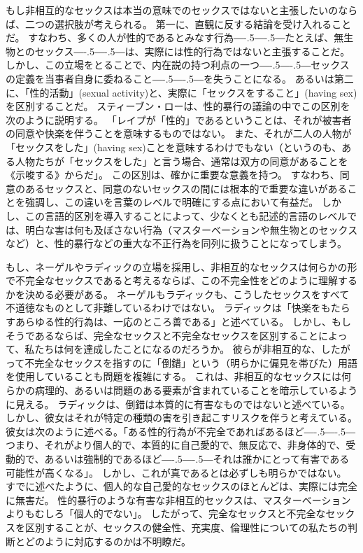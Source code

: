 \documentclass[paper=a4,book,openany]{jlreq}
\def\DDASH{―\kern-.5\zw―\kern-.5\zw―} %
\begin{document}
もし非相互的なセックスは本当の意味でのセックスではないと主張したいのならば、二つの選択肢が考えられる。
第一に、直観に反する結論を受け入れることだ。
すなわち、多くの人が性的であるとみなす行為{\DDASH}たとえば、無生物とのセックス{\DDASH}は、実際には性的行為ではないと主張することだ。
しかし、この立場をとることで、内在説の持つ利点の一つ{\DDASH}セックスの定義を当事者自身に委ねること{\DDASH}を失うことになる。
あるいは第二に、「性的活動」(sexual activity)と、実際に「セックスをすること」(having sex)を区別することだ。
スティーブン・ローは、性的暴行の議論の中でこの区別を次のように説明する。
「レイプが「性的」であるということは、それが被害者の同意や快楽を伴うことを意味するものではない。
また、それが二人の人物が「セックスをした」(having sex)ことを意味するわけでもない（というのも、ある人物たちが「セックスをした」と言う場合、通常は双方の同意があることを《示唆する》からだ」\citep[p.69]{law09:_rape_is_sex_act}。
この区別は、確かに重要な意義を持つ。
すなわち、同意のあるセックスと、同意のないセックスの間には根本的で重要な違いがあることを強調し、この違いを言葉のレベルで明確にする点において有益だ。
しかし、この言語的区別を導入することによって、少なくとも記述的言語のレベルでは、明白な害は何も及ぼさない行為（マスターベーションや無生物とのセックスなど）と、性的暴行などの重大な不正行為を同列に扱うことになってしまう。

もし、ネーゲルやラディックの立場を採用し、非相互的なセックスは何らかの形で不完全なセックスであると考えるならば、この不完全性をどのように理解するかを決める必要がある。
ネーゲルもラディックも、こうしたセックスをすべて不道徳なものとして非難しているわけではない。
ラディックは「快楽をもたらすあらゆる性的行為は、一応のところ善である」と述べている\citep[p.100]{ruddick75:_better_sex}。
しかし、もしそうであるならば、完全なセックスと不完全なセックスを区別することによって、私たちは何を達成したことになるのだろうか。
彼らが非相互的な、したがって不完全なセックスを指すのに「倒錯」という（明らかに偏見を帯びた）用語を使用していることも問題を複雑にする。
これは、非相互的なセックスには何らかの病理的、あるいは問題のある要素が含まれていることを暗示しているように見える。
ラディックは、倒錯は本質的に有害なものではないと述べている。
しかし、彼女はそれが特定の種類の害を引き起こすリスクを伴うと考えている。
彼女は次のように述べる。「ある性的行為が不完全であればあるほど{\DDASH}つまり、それがより個人的で、本質的に自己愛的で、無反応で、非身体的で、受動的で、あるいは強制的であるほど{\DDASH}それは誰かにとって有害である可能性が高くなる」\citep[pp.100--101]{ruddick75:_better_sex}。
しかし、これが真であるとは必ずしも明らかではない。
すでに述べたように、個人的な自己愛的なセックスのほとんどは、実際には完全に無害だ。
性的暴行のような有害な非相互的セックスは、マスターベーションよりもむしろ「個人的でない」。
したがって、完全なセックスと不完全なセックスを区別することが、セックスの健全性、充実度、倫理性についての私たちの判断とどのように対応するのかは不明瞭だ。
\end{document}
